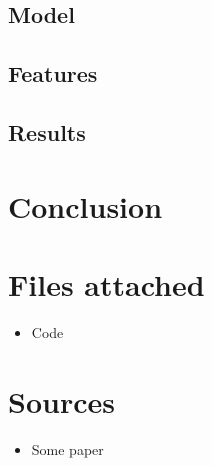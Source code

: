 \documentclass{article}
\begin{document}
\subsection*{Model}

\subsection*{Features}


\subsection*{Results}

\pagebreak

\section*{Conclusion}

\section*{Files attached}
\begin{itemize}
\item Code
\end{itemize}

\section*{Sources}

\begin{itemize}

\item Some paper
\end{itemize}
\end{document}
